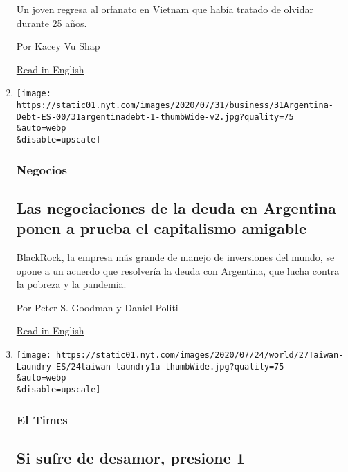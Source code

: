 \begin{enumerate}
  Un joven regresa al orfanato en Vietnam que había tratado de olvidar
  durante 25 años.

  Por Kacey Vu Shap

  \href{https://www.nytimes.com/2020/07/24/style/modern-love-adoption-vietnam-why-did-she-leave-me-there.html}{Read
  in English}
\item
  \href{/es/2020/07/31/espanol/negocios/argentina-deuda.html}{}

  \texttt{[image: https://static01.nyt.com/images/2020/07/31/business/31Argentina-Debt-ES-00/31argentinadebt-1-thumbWide-v2.jpg?quality=75\\\&auto=webp\\\&disable=upscale]}

  \hypertarget{negocios}{%
  \subsubsection{Negocios}\label{negocios}}

  \hypertarget{las-negociaciones-de-la-deuda-en-argentina-ponen-a-prueba-el-capitalismo-amigable}{%
  \subsection{Las negociaciones de la deuda en Argentina ponen a prueba
  el capitalismo
  amigable}\label{las-negociaciones-de-la-deuda-en-argentina-ponen-a-prueba-el-capitalismo-amigable}}

  BlackRock, la empresa más grande de manejo de inversiones del mundo,
  se opone a un acuerdo que resolvería la deuda con Argentina, que lucha
  contra la pobreza y la pandemia.

  Por Peter S. Goodman y Daniel Politi

  \href{https://www.nytimes.com/2020/07/31/business/argentina-debt.html}{Read
  in English}
\item
  \href{/es/2020/07/31/espanol/elecciones-2020-trump-mexico-violencia.html}{}

  \texttt{[image: https://static01.nyt.com/images/2020/07/24/world/27Taiwan-Laundry-ES/24taiwan-laundry1a-thumbWide.jpg?quality=75\\\&auto=webp\\\&disable=upscale]}

  \hypertarget{el-times}{%
  \subsubsection{El Times}\label{el-times}}

  \hypertarget{si-sufre-de-desamor-presione-1}{%
  \subsection{Si sufre de desamor, presione
  1}\label{si-sufre-de-desamor-presione-1}}


\end{enumerate}
